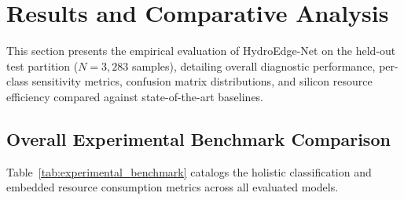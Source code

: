 \section{Results and Comparative Analysis}
\label{sec:results}

This section presents the empirical evaluation of HydroEdge-Net on the held-out test partition ($N = 3,283$ samples), detailing overall diagnostic performance, per-class sensitivity metrics, confusion matrix distributions, and silicon resource efficiency compared against state-of-the-art baselines.

\subsection{Overall Experimental Benchmark Comparison}

Table~\ref{tab:experimental_benchmark} catalogs the holistic classification and embedded resource consumption metrics across all evaluated models.

\begin{table}[!t]
\caption{Comprehensive Experimental Benchmark on Held-Out Test Split ($N = 3,283$)}
\label{tab:experimental_benchmark}
\centering
\renewcommand{\arraystretch}{1.25}
\end{table}

